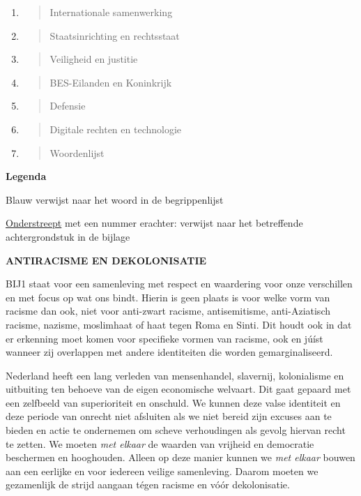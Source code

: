 \begin{enumerate}
\item
  \begin{quote}
  Internationale samenwerking
  \end{quote}
\item
  \begin{quote}
  Staatsinrichting en rechtsstaat
  \end{quote}
\item
  \begin{quote}
  Veiligheid en justitie
  \end{quote}
\item
  \begin{quote}
  BES-Eilanden en Koninkrijk
  \end{quote}
\item
  \begin{quote}
  Defensie
  \end{quote}
\item
  \begin{quote}
  Digitale rechten en technologie
  \end{quote}
\item
  \begin{quote}
  Woordenlijst
  \end{quote}
\end{enumerate}

\textbf{Legenda}

Blauw verwijst naar het woord in de begrippenlijst

\underline{Onderstreept} met een nummer erachter: verwijst naar het
betreffende achtergrondstuk in de bijlage

\textbf{ANTIRACISME EN DEKOLONISATIE}

BIJ1 staat voor een samenleving met respect en waardering voor onze
verschillen en met focus op wat ons bindt. Hierin is geen plaats is voor
welke vorm van racisme dan ook, niet voor anti-zwart racisme,
antisemitisme, anti-Aziatisch racisme, nazisme, moslimhaat of haat tegen
Roma en Sinti. Dit houdt ook in dat er erkenning moet komen voor
specifieke vormen van racisme, ook en júíst wanneer zij overlappen met
andere identiteiten die worden gemarginaliseerd.

Nederland heeft een lang verleden van mensenhandel, slavernij,
kolonialisme en uitbuiting ten behoeve van de eigen economische
welvaart. Dit gaat gepaard met een zelfbeeld van superioriteit en
onschuld. We kunnen deze valse identiteit en deze periode van onrecht
niet afsluiten als we niet bereid zijn excuses aan te bieden en actie te
ondernemen om scheve verhoudingen als gevolg hiervan recht te zetten. We
moeten \emph{met elkaar} de waarden van vrijheid en democratie
beschermen en hooghouden. Alleen op deze manier kunnen we \emph{met
elkaar} bouwen aan een eerlijke en voor iedereen veilige samenleving.
Daarom moeten we gezamenlijk de strijd aangaan tégen racisme en vóór
dekolonisatie.

